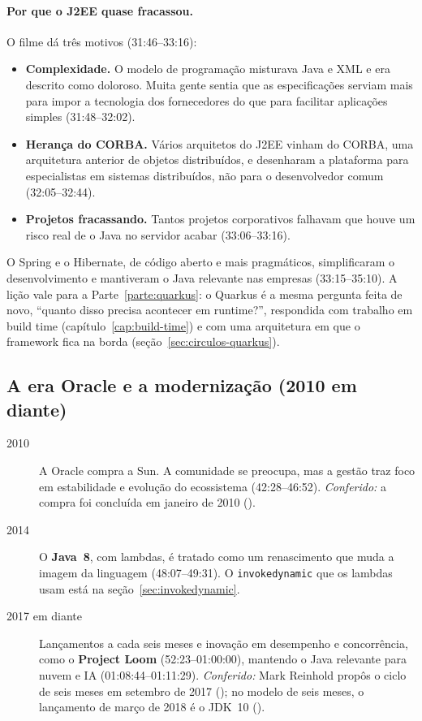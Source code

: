\paragraph{Por que o J2EE quase fracassou.}
O filme dá três motivos (31:46--33:16):
\begin{itemize}
\item \textbf{Complexidade.} O modelo de programação misturava Java e XML
  e era descrito como doloroso. Muita gente sentia que as especificações
  serviam mais para impor a tecnologia dos fornecedores do que para
  facilitar aplicações simples (31:48--32:02).
\item \textbf{Herança do CORBA.} Vários arquitetos do J2EE vinham do
  CORBA, uma arquitetura anterior de objetos distribuídos, e desenharam a
  plataforma para especialistas em sistemas distribuídos, não para o
  desenvolvedor comum (32:05--32:44).
\item \textbf{Projetos fracassando.} Tantos projetos corporativos falhavam
  que houve um risco real de o Java no servidor acabar (33:06--33:16).
\end{itemize}
O Spring e o Hibernate, de código aberto e mais pragmáticos, simplificaram
o desenvolvimento e mantiveram o Java relevante nas empresas
(33:15--35:10). A lição vale para a Parte~\ref{parte:quarkus}: o Quarkus é a mesma
pergunta feita de novo, \enquote{quanto disso precisa acontecer em
runtime?}, respondida com trabalho em build time
(capítulo~\ref{cap:build-time}) e com uma arquitetura em que o framework
fica na borda (seção~\ref{sec:circulos-quarkus}).

\subsection{A era Oracle e a modernização (2010 em diante)}
\begin{description}
\item[2010] A Oracle compra a Sun. A comunidade se preocupa, mas a gestão
  traz foco em estabilidade e evolução do ecossistema (42:28--46:52).
  \emph{Conferido:} a compra foi concluída em janeiro de 2010
  ().
\item[2014] O \textbf{Java~8}, com lambdas, é tratado como um
  renascimento que muda a imagem da linguagem (48:07--49:31). O
  \texttt{invokedynamic} que os lambdas usam está na
  seção~\ref{sec:invokedynamic}.
\item[2017 em diante] Lançamentos a cada seis meses e inovação em
  desempenho e concorrência, como o \textbf{Project Loom}
  (52:23--01:00:00), mantendo o Java relevante para nuvem e IA
  (01:08:44--01:11:29). \emph{Conferido:} Mark Reinhold propôs o ciclo de
  seis meses em setembro de 2017 (); no
  modelo de seis meses, o lançamento de março de 2018 é o JDK~10
  ().
\end{description}

